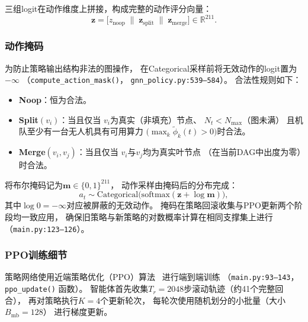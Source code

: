 三组logit在动作维度上拼接，构成完整的动作评分向量：
\begin{equation}
  \mathbf{z} =
    \bigl[z_{\text{noop}}\;\|\;
          \mathbf{z}_{\text{split}}\;\|\;
          \mathbf{z}_{\text{merge}}\bigr]
    \in \mathbb{R}^{211}.
  \label{eq:all_logits}
\end{equation}

\subsubsection*{动作掩码}

为防止策略输出结构非法的图操作，
在Categorical采样前将无效动作的logit置为$-\infty$
（\texttt{compute\_action\_mask()}，
\texttt{gnn\_policy.py:539--584}）。
合法性规则如下：
\begin{itemize}[leftmargin=*, itemsep=2pt]
  \item \textbf{Noop}：恒为合法。
  \item \textbf{Split$(v_i)$}：当且仅当
        $v_i$为真实（非填充）节点、
        $N_t < N_{\max}$（图未满）
        且机队至少有一台无人机具有可用算力
        $\bigl(\max_k \tilde{\phi}_k(t) > 0\bigr)$时合法。
  \item \textbf{Merge$(v_i, v_j)$}：当且仅当
        $v_i$与$v_j$均为真实叶节点
        （在当前DAG中出度为零）时合法。
\end{itemize}
将布尔掩码记为$\mathbf{m} \in \{0,1\}^{211}$，
动作采样由掩码后的分布完成：
\begin{equation}
  a_t \sim \mathrm{Categorical}\!\bigl(
    \mathrm{softmax}(\mathbf{z} + \log \mathbf{m})
  \bigr),
  \label{eq:masked_sample}
\end{equation}
其中$\log 0 = -\infty$对应被屏蔽的无效动作。
掩码在策略回滚收集与PPO更新两个阶段均一致应用，
确保旧策略与新策略的对数概率计算在相同支撑集上进行
（\texttt{main.py:123--126}）。

\subsubsection*{PPO训练细节}

策略网络使用近端策略优化（PPO）算法~\cite{schulman2017proximal}
进行端到端训练
（\texttt{main.py:93--143}，\texttt{ppo\_update()} 函数）。
智能体首先收集$T_r = 2048$步滚动轨迹（约41个完整回合），
再对策略执行$K = 4$个更新轮次，
每轮次使用随机划分的小批量（大小$B_{\text{mb}} = 128$）
进行梯度更新。

